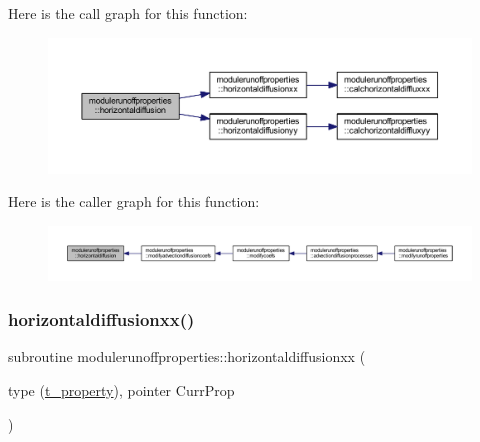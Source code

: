 Here is the call graph for this function\+:\nopagebreak
\begin{figure}[H]
\begin{center}
\leavevmode
\includegraphics[width=350pt]{namespacemodulerunoffproperties_af92ead42cead9acb2a8896534d8d3dfb_cgraph}
\end{center}
\end{figure}
Here is the caller graph for this function\+:\nopagebreak
\begin{figure}[H]
\begin{center}
\leavevmode
\includegraphics[width=350pt]{namespacemodulerunoffproperties_af92ead42cead9acb2a8896534d8d3dfb_icgraph}
\end{center}
\end{figure}
\mbox{\label{namespacemodulerunoffproperties_aa14d5eb72e2b9e8e165bfbb537331410}} 
\subsubsection{\texorpdfstring{horizontaldiffusionxx()}{horizontaldiffusionxx()}}
{\footnotesize\ttfamily subroutine modulerunoffproperties\+::horizontaldiffusionxx (\begin{DoxyParamCaption}\item[{type (\mbox{\hyperlink{structmodulerunoffproperties_1_1t__property}{t\+\_\+property}}), pointer}]{Curr\+Prop }\end{DoxyParamCaption})\hspace{0.3cm}{\ttfamily [private]}}

